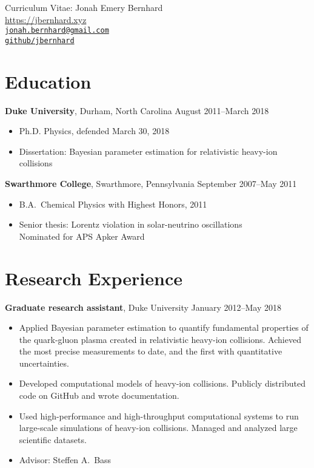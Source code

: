 \documentclass[letterpaper,10pt]{article}
\newcommand{\entry}[3]{\vspace{.5em plus .1em minus .1em}\textbf{#1}, #2 \hfill #3}
\begin{document}
\begin{center}
  \Large
  Curriculum Vitae:  Jonah Emery Bernhard \\[1ex]
  \normalsize\rm
  \url{https://jbernhard.xyz} \\
  \href{mailto:jonah.bernhard@gmail.com}{\nolinkurl{jonah.bernhard@gmail.com}} \\
  \href{https://github.com/jbernhard}{\nolinkurl{github/jbernhard}}
\end{center}


\section{Education}

\entry{Duke University}{Durham, North Carolina}{August 2011--March 2018}

\begin{itemize}
  \item Ph.D. Physics, defended March 30, 2018
  \item Dissertation: Bayesian parameter estimation for relativistic heavy-ion collisions
\end{itemize}

\entry{Swarthmore College}{Swarthmore, Pennsylvania}{September 2007--May 2011}

\begin{itemize}
  \item B.A.\ Chemical Physics with Highest Honors, 2011
  \item Senior thesis: Lorentz violation in solar-neutrino oscillations \\
    Nominated for APS Apker Award
\end{itemize}


\section{Research Experience}

\entry{Graduate research assistant}{Duke University}{January 2012--May 2018}

\begin{itemize}
  \item Applied Bayesian parameter estimation to quantify fundamental properties of the quark-gluon plasma created in relativistic heavy-ion collisions.
    Achieved the most precise measurements to date, and the first with quantitative uncertainties.
  \item Developed computational models of heavy-ion collisions.
    Publicly distributed code on GitHub and wrote documentation.
  \item Used high-performance and high-throughput computational systems to run large-scale simulations of heavy-ion collisions.
    Managed and analyzed large scientific datasets.
  \item Advisor: Steffen A.\ Bass
\end{itemize}
\end{document}
